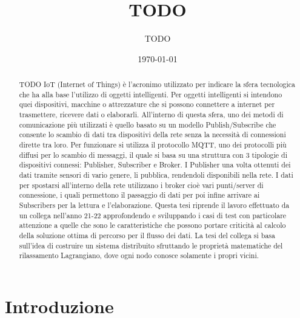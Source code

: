 \documentclass[12pt,a4paper,openright,oneside]{book} %
\title{TODO}
\author{TODO}
\date{\today}
\begin{document}
\frontmatter{}\frontispiece
\tableofcontents  
\listoffigures
\listoftables
\lstlistoflistings
\afterpage{\null
           \thispagestyle{empty}
           \addtocounter{page}{-1}
           \newpage}
\begin{abstract}	
TODO
IoT (Internet of Things) è l'acronimo utilizzato per indicare la sfera tecnologica che ha alla base l'utilizzo di oggetti intelligenti. 
Per oggetti intelligenti si intendono quei dispositivi, macchine o attrezzature che si possono connettere a internet per trasmettere, ricevere dati o elaborarli.
All'interno di questa sfera, uno dei metodi di comunicazione più utilizzati è quello basato su un modello Publish/Subscribe che consente lo scambio di dati tra dispositivi della rete senza la necessità di connessioni dirette tra loro.
Per funzionare si utilizza il protocollo MQTT, uno dei protocolli più diffusi per lo scambio di messaggi, il quale si basa su una struttura con 3 tipologie di dispositivi connessi: Publisher, Subscriber e Broker.
I Publisher una volta ottenuti dei dati tramite sensori di vario genere, li pubblica, rendendoli disponibili nella rete. I dati per spostarsi all'interno della rete utilizzano i broker cioè vari punti/server di connessione, i quali permettono il passaggio di dati per poi infine arrivare ai Subscribers per la lettura e l'elaborazione.
Questa tesi riprende il lavoro effettuato da un collega nell'anno 21-22 approfondendo e sviluppando i casi di test con particolare attenzione a quelle che sono le caratteristiche che 
possono portare criticità al calcolo della soluzione ottima di percorso per il flusso dei dati.
La tesi del collega si basa sull'idea di costruire un sistema distribuito sfruttando le proprietà matematiche del rilassamento Lagrangiano, dove ogni nodo conosce solamente i propri vicini.

\end{abstract}
\mainmatter
\chapter{Introduzione}
\label{chap:introduction}
\end{document}
